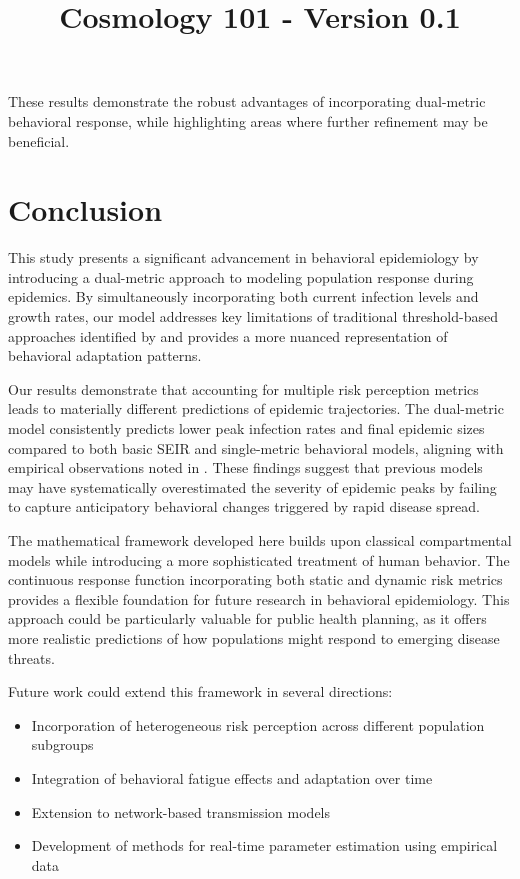 \documentclass{article}\usepackage{graphicx} \usepackage{amsmath} \usepackage{colortbl}\title{Cosmology 101 - Version 0.1}
\begin{document}
These results demonstrate the robust advantages of incorporating dual-metric behavioral response, while highlighting areas where further refinement may be beneficial.\section{Conclusion}
This study presents a significant advancement in behavioral epidemiology by introducing a dual-metric approach to modeling population response during epidemics. By simultaneously incorporating both current infection levels and growth rates, our model addresses key limitations of traditional threshold-based approaches identified by \cite{funk2010modelling} and provides a more nuanced representation of behavioral adaptation patterns.

Our results demonstrate that accounting for multiple risk perception metrics leads to materially different predictions of epidemic trajectories. The dual-metric model consistently predicts lower peak infection rates and final epidemic sizes compared to both basic SEIR and single-metric behavioral models, aligning with empirical observations noted in \cite{wang2020impact}. These findings suggest that previous models may have systematically overestimated the severity of epidemic peaks by failing to capture anticipatory behavioral changes triggered by rapid disease spread.

The mathematical framework developed here builds upon classical compartmental models \cite{anderson1992infectious} while introducing a more sophisticated treatment of human behavior. The continuous response function incorporating both static and dynamic risk metrics provides a flexible foundation for future research in behavioral epidemiology. This approach could be particularly valuable for public health planning, as it offers more realistic predictions of how populations might respond to emerging disease threats.

Future work could extend this framework in several directions:

\begin{itemize}
\item Incorporation of heterogeneous risk perception across different population subgroups
\item Integration of behavioral fatigue effects and adaptation over time
\item Extension to network-based transmission models
\item Development of methods for real-time parameter estimation using empirical data
\end{itemize}
\end{document}
